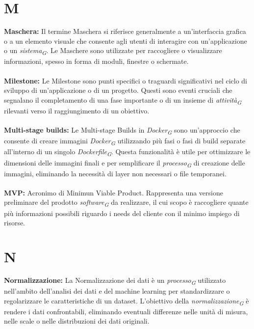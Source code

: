 \documentclass{article}
\begin{document}
\section*{M}
{}
\textbf{Maschera:} Il termine Maschera si riferisce generalmente a un'interfaccia grafica o a un elemento visuale che consente agli utenti di interagire con un'applicazione o un \textit{sistema}\textsubscript{\textit{G}}. Le Maschere sono utilizzate per raccogliere o visualizzare informazioni, spesso in forma di moduli, finestre o schermate.
\\
\\
\textbf{Milestone:} Le Milestone sono punti specifici o traguardi significativi nel ciclo di sviluppo di un'applicazione o di un progetto. Questi sono eventi cruciali che segnalano il completamento di una fase importante o di un insieme di \textit{attività}\textsubscript{\textit{G}} rilevanti verso il raggiungimento di un obiettivo.
\\
\\
\textbf{Multi-stage builds:} Le Multi-stage Builds in \textit{Docker}\textsubscript{\textit{G}} sono un'approccio che consente di creare immagini \textit{Docker}\textsubscript{\textit{G}} utilizzando più fasi o fasi di build separate all'interno di un singolo \textit{Dockerfile}\textsubscript{\textit{G}}. Questa funzionalità è utile per ottimizzare le dimensioni delle immagini finali e per semplificare il \textit{processo}\textsubscript{\textit{G}} di creazione delle immagini, eliminando la necessità di layer non necessari o file temporanei.
\\
\\
\textbf{MVP:} Acronimo di Minimun Viable Product. Rappresenta una versione preliminare del prodotto \textit{software}\textsubscript{\textit{G}} da realizzare, il cui scopo è raccogliere quante più informazioni possibili riguardo i needs del cliente con il minimo impiego di risorse.
\pagebreak
\section*{N}
{}
\textbf{Normalizzazione:} La Normalizzazione dei dati è un \textit{processo}\textsubscript{\textit{G}} utilizzato nell'ambito dell'analisi dei dati e del machine learning per standardizzare o regolarizzare le caratteristiche di un dataset. L'obiettivo della \textit{normalizzazione}\textsubscript{\textit{G}} è rendere i dati confrontabili, eliminando eventuali differenze nelle unità di misura, nelle scale o nelle distribuzioni dei dati originali.
\pagebreak
\end{document}
